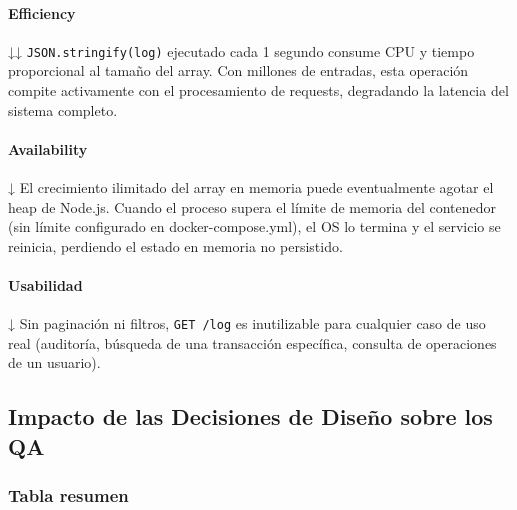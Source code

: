 \paragraph{Efficiency} ↓↓ \texttt{JSON.stringify(log)} ejecutado cada 1 segundo consume CPU y tiempo proporcional al tamaño del array. Con millones de entradas, esta operación compite activamente con el procesamiento de requests, degradando la latencia del sistema completo.

\paragraph{Availability} ↓ El crecimiento ilimitado del array en memoria puede eventualmente agotar el heap de Node.js. Cuando el proceso supera el límite de memoria del contenedor (sin límite configurado en docker-compose.yml), el OS lo termina y el servicio se reinicia, perdiendo el estado en memoria no persistido.

\paragraph{Usabilidad} ↓ Sin paginación ni filtros, \texttt{GET /log} es inutilizable para cualquier caso de uso real (auditoría, búsqueda de una transacción específica, consulta de operaciones de un usuario).

\subsection{Impacto de las Decisiones de Diseño sobre los QA}

\subsubsection{Tabla resumen}

